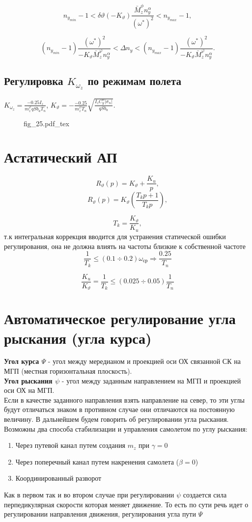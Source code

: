 \documentclass{article}
\begin{document}
\[
	n_{{y}_{min}} - 1<  \delta \vartheta (- K_\vartheta)\frac{\bar{M}_z^\phi n_y^\alpha}{(\omega^*)^2} < n_{{y}_{max}} - 1,
\]

\[
	(n_{{y}_{min}} - 1)\frac{(\omega^*)^2}{-K_{\vartheta}\bar{M}_z^\varphi n_y^\alpha}< \Delta n_y< (n_{{y}_{max}} - 1) \frac{(\omega^*)^2}{-K_{\vartheta}\bar{M}_z^\varphi n_y^\alpha}.
\]

\subsection{Регулировка \texorpdfstring{$K_{\omega_z}$}{Lg} по режимам полета}
$K_{\omega_z}  =\frac{-0.25 I_z}{m_z^\varphi q S b_a T_n}$, $K_{\vartheta}  = - \frac{-0.25}{m_z^\varphi T_n} \sqrt{\frac{I_z C_y^\alpha |\sigma_n|}{qSb_a}}$.
\begin{figure}[H]
	\centering
	{fig_25.pdf_tex}
\end{figure}

\section{Астатический АП}
\[
	R_{\vartheta}(p) = K_\vartheta + \frac{K_u}{p},
\]
\[
	R_{\vartheta}(p) = K_\vartheta(\frac{T_k p  + 1 }{T_k p}),
\]

\[
	T_k = \frac{K_\vartheta}{K_u},
\]
т.к интегральная коррекция вводится для устранения статической ошибки регулирования, она не должна влиять на частоты близкие к собственной частоте 
\[
	\frac{1}{T_k} \leq (0.1 \div 0.2) \omega_\text{ср} \Rightarrow \frac{0.25}{T_n}
\]

\[
	\frac{K_u}{K_\vartheta} =  \frac{1}{T_k} \leq (0.025 \div 0.05) \frac{1}{T_n}
\]
\section{Автоматическое регулирование угла рыскания (угла курса)}
\textbf{Угол курса $\Psi$} - угол между мередианом и проекцией оси ОХ связанной СК на МГП (местная горизонтальная плоскость).\\
\textbf{Угол рыскания $\psi$} - угол между заданным направлением на МГП и проекцией оси ОХ на МГП.\\
Если в качестве заданного направления взять направление на север, то эти углы будут отличаться знаком в противном случае они отличаются на постоянную величину. В дальнейшем будем говорить об регулировании угла рыскания. Возможны два способа стабилизации и управления самолетом по углу рыскания:
\begin{enumerate}
	\item Через путевой канал путем создания $m_z$ при $\gamma = 0$
	\item Через поперечный канал путем накренения самолета ($\beta = 0$)
	\item Координированный разворот
\end{enumerate}
Как в первом так и во втором случае при регулировании $\psi$ создается сила перпедикулярная скорости которая меняет движение. То есть по сути речь идет о регулировании направления движения, регулирования угла пути $\Psi$
\end{document}
